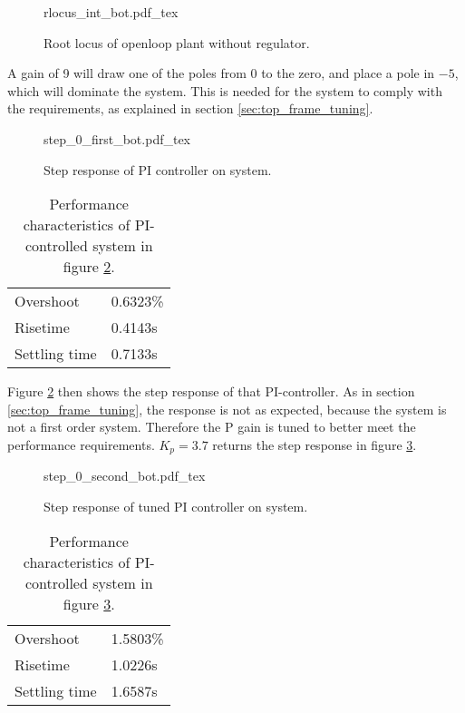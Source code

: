 \documentclass[../../../Main]{subfiles}
\begin{document}
\begin{figure}[H]
\centering
\def\svgwidth{\textwidth}
{rlocus_int_bot.pdf_tex}
\caption{Root locus of openloop plant without regulator.}
\label{fig:rlocus_int_bot}
\end{figure}

A gain of 9 will draw one of the poles from $0$ to the zero, and place a pole in $-5$, which will dominate the system. This is needed for the system to comply with the requirements, as explained in section \ref{sec:top_frame_tuning}.

\begin{figure}[H]
\centering
\def\svgwidth{\textwidth}
{step_0_first_bot.pdf_tex}
\caption{Step response of PI controller on system.}
\label{fig:step_0_first_bot}
\end{figure}


\begin{table}[h]
	 \centering
	 \begin{tabular}{ll}
		 Overshoot & 0.6323\%\\
		 Risetime  & 0.4143s\\
		 Settling time & 0.7133s
	 \end{tabular}
	 \caption{Performance characteristics of PI-controlled system in figure \ref{fig:step_0_first_bot}.}
	 \label{tab:performance_0_5}
\end{table}



Figure \ref{fig:step_0_first_bot} then shows the step response of that PI-controller.
As in section \ref{sec:top_frame_tuning}, the response is not as expected, because the system is not a first order system. Therefore the P gain is tuned to better meet the performance requirements. $K_p = 3.7$ returns the step response in figure \ref{fig:step_0_second_bot}.

\begin{figure}[H]
\centering
\def\svgwidth{\textwidth}
{step_0_second_bot.pdf_tex}
\caption{Step response of tuned PI controller on system.}
\label{fig:step_0_second_bot}
\end{figure}


\begin{table}[h]
	 \centering
	 \begin{tabular}{ll}
		 Overshoot & 1.5803\%\\
		 Risetime  & 1.0226s\\
		 Settling time & 1.6587s
	 \end{tabular}
	 \caption{Performance characteristics of PI-controlled system in figure \ref{fig:step_0_second_bot}.}
	 \label{tab:performance_0_6}
\end{table}
\end{document}
